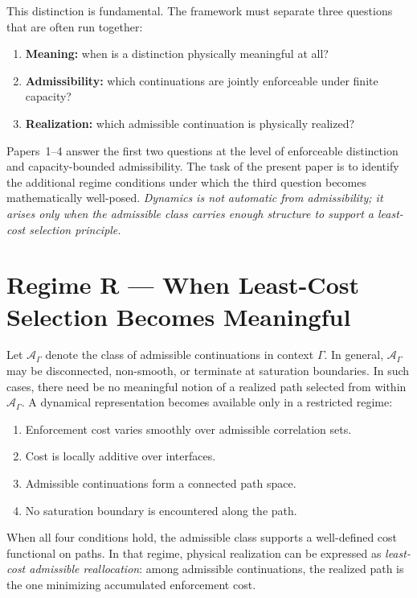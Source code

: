 \documentclass[11pt]{article}
\begin{document}
This distinction is fundamental. The framework must separate three questions
that are often run together:
\begin{enumerate}[leftmargin=1.6em]
    \item \textbf{Meaning:} when is a distinction physically meaningful at all?
    \item \textbf{Admissibility:} which continuations are jointly enforceable
    under finite capacity?
    \item \textbf{Realization:} which admissible continuation is physically
    realized?
\end{enumerate}
Papers~1--4 answer the first two questions at the level of enforceable
distinction and capacity-bounded admissibility. The task of the present paper is
to identify the additional regime conditions under which the third question
becomes mathematically well-posed. \emph{Dynamics is not automatic from
admissibility; it arises only when the admissible class carries enough structure
to support a least-cost selection principle.}

\section{Regime R --- When Least-Cost Selection Becomes Meaningful}\label{sec:regimeR}

Let $\mathcal{A}_{\Gamma}$ denote the class of admissible continuations in
context $\Gamma$. In general, $\mathcal{A}_{\Gamma}$ may be disconnected,
non-smooth, or terminate at saturation boundaries. In such cases, there need be
no meaningful notion of a realized path selected from within
$\mathcal{A}_{\Gamma}$. A dynamical representation becomes available only in a
restricted regime:

\begin{enumerate}[label=(R\arabic*),leftmargin=1.8em]
    \item Enforcement cost varies smoothly over admissible correlation sets.
    \item Cost is locally additive over interfaces.
    \item Admissible continuations form a connected path space.
    \item No saturation boundary is encountered along the path.
\end{enumerate}

When all four conditions hold, the admissible class supports a well-defined cost
functional on paths. In that regime, physical realization can be expressed as
\emph{least-cost admissible reallocation}: among admissible continuations, the
realized path is the one minimizing accumulated enforcement cost.
\end{document}
